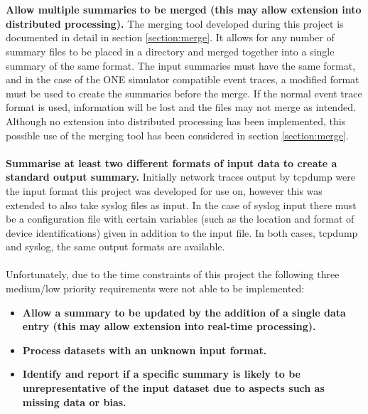 \\\\
\textbf{Allow multiple summaries to be merged (this may allow extension into distributed processing).}
The merging tool developed during this project is documented in detail in section \ref{section:merge}. It allows for any number of summary files to be placed in a directory and merged together into a single summary of the same format. The input summaries must have the same format, and in the case of the ONE simulator compatible  event traces, a modified format must be used to create the summaries before the merge. If the normal event trace format is used, information will be lost and the files may not merge as intended.
Although no extension into distributed processing has been implemented, this possible use of the merging tool has been considered in section \ref{section:merge}.  
\\\\
\textbf{Summarise at least two different formats of input data to create a standard output summary.}
Initially network traces output by tcpdump were the input format this project was developed for use on, however this was extended to also take syslog files as input. In the case of syslog input there must be a configuration file with certain variables (such as the location and format of device identifications) given in addition to the input file. In both cases, tcpdump and syslog, the same output formats are available. 
\\\\
Unfortunately, due to the time constraints of this project the following three medium/low priority requirements were not able to be implemented:
\begin{itemize}
\item \textbf{Allow a summary to be updated by the addition of a single data entry (this may allow extension into real-time processing).}
\item \textbf{Process datasets with an unknown input format.}
\item \textbf{Identify and report if a specific summary is likely to be unrepresentative of the input dataset due to aspects such as missing data or bias.}
\end{itemize}

